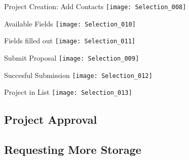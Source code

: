 \begin{frame}[c]{Project Creation: Add Contacts}
    \texttt{[image: Selection\_008]}
\end{frame}

\begin{frame}[c]{Available Fields}
    \texttt{[image: Selection\_010]}
\end{frame}

\begin{frame}[c]{Fields filled out}
    \texttt{[image: Selection\_011]}
\end{frame}

\begin{frame}[c]{Submit Proposal}
    \texttt{[image: Selection\_009]}
\end{frame}

\begin{frame}[c]{Succesful Submission}
    \texttt{[image: Selection\_012]}
\end{frame}

\begin{frame}[c]{Project in List}
    \texttt{[image: Selection\_013]}
\end{frame}

\subsection{Project Approval}

\subsection{Requesting More Storage}


